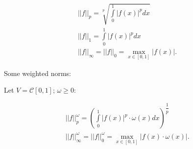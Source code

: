 \[
    \begin{array}{c}
        \displaystyle ||f||_p = \sqrt[p]{\int\limits_{0}^1 |f(x)|^p dx}  \\
        \displaystyle ||f||_1 = \int\limits_{0}^1 |f(x)|^p dx\\
        \displaystyle ||f||_\infty = ||f||_0 = \max\limits_{x \in [0,1]} |f(x)|.
    \end{array}  
\]
\par 
Some weighted norms:

Let $V = \mathcal{C}[0,1]$; $\omega \geq 0$:

\[
    \begin{array}{c}
        \displaystyle ||f||_p^\omega = \left(\int\limits_0^1 |f(x)|^p \cdot \omega(x) dx\right)^\dfrac{1}{p} \\
        \displaystyle ||f||_\infty^\omega = ||f||_0^\omega = \max\limits_{x\in [0,1]} |f(x) \cdot \omega(x)|.
    \end{array}  
\]

